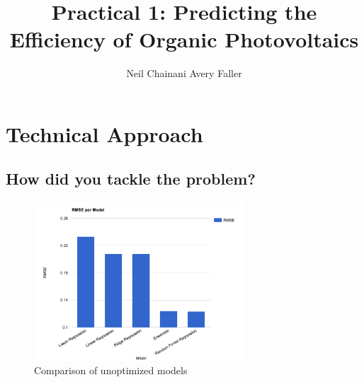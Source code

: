 \documentclass[]{article}
\title{{\bf Practical 1}: Predicting the Efficiency of Organic Photovoltaics}
\author{Neil Chainani
		Avery Faller}
\begin{document}
	
\maketitle

\section{Technical Approach}
\subsection*{How did you tackle the problem?}
\begin{figure}[h]
	\centering
	\includegraphics[width=0.7\textwidth]{ModelComparison}
	\caption{Comparison of unoptimized models}
\end{figure}
\end{document}
